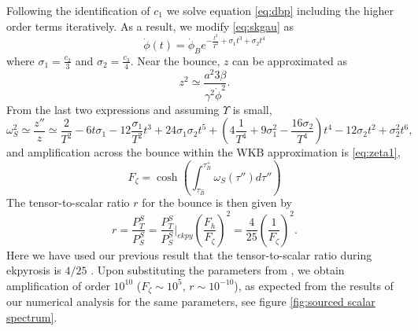 \documentclass[12pt,a4paper]{article}
\numberwithin{equation}{section}
\numberwithin{equation}{section}
\begin{document}
Following the identification of $c_1$ we solve equation \eqref{eq:dbp} including the higher order terms iteratively. As a result, we modify  
\eqref{eq:skgau} as
\begin{equation}
    \dot{\phi}(t) = \dot \phi_B e^{-\frac{t^2}{T^2}+ \sigma_1 t^3+ \sigma_2 t^4}
    \label{eq:newphi}
\end{equation}
where $\sigma_1 = \frac{c_2}{3}$ and $\sigma_2=\frac{c_3}{4}$. 
Near the bounce, $z$ can be approximated as 
\begin{equation}
    z^2 \simeq \frac{a^2 3\beta }{\gamma^2\dot{\phi}^2}. 
\end{equation}
From the last two expressions and assuming $\Upsilon$ is small, 
\begin{equation}
    \omega_S^2   \simeq \frac{z''}{z} %
      \simeq \frac{2}{T^2}- 6 t \sigma_1-12\frac{\sigma_1}{T^2} t^3+24 \sigma_1 \sigma_2 t^5+\left(4\frac{1}{T^4}+9 \sigma_1^2- \frac{16\sigma_2}{T^4} \right)t^4-12\sigma_2 t^2+\sigma_2^2 t^6,
\label{eq:omegas}
\end{equation}
and amplification across the bounce within the WKB approximation is \eqref{eq:zeta1},
\begin{equation}
    F_{\zeta}= \cosh(\int_{\tau_{B}^-}^{\tau_{B}^+} \omega_S(\tau'') d\tau'') 
     \label{eq:amp}
\end{equation}
The tensor-to-scalar ratio $r$ for the bounce is then given by
\begin{equation}
    r = \frac{P_T^S}{P_S^S} = \frac{P_T^S}{P_S^S}|_{ekpy} \left( \frac{F_{h}}{F_{\zeta}} \right)^2 = \frac{4}{25}  \left( \frac{1}{F_{\zeta}} \right)^2.
\end{equation}
Here we have used our previous result that the tensor-to-scalar ratio during ekpyrosis is $4/25$ \cite{Artymowski:2020pci,r3}. 
Upon substituting the parameters from \cite{Cai:2012va}, we obtain amplification of order $10^{10}$ ($F_{\zeta}\sim 10^5, \, r\sim 10^{-10}$), as expected from the results of our numerical analysis for the same parameters, see figure \ref{fig:sourced scalar spectrum}. %
\end{document}
